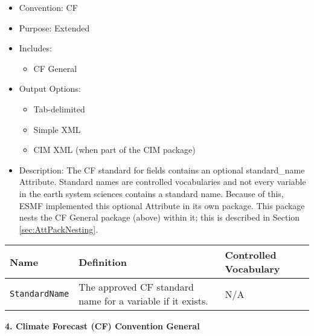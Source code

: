 \begin{itemize}
    \item Convention: CF
    \item Purpose: Extended
    \item Includes: 
    \begin{itemize}
        \item CF General
    \end{itemize}
    \item Output Options: 
    \begin{itemize}
        \item Tab-delimited
        \item Simple XML
        \item CIM XML (when part of the CIM package)
    \end{itemize} 
    \item Description: The CF standard for fields contains an optional standard\_name Attribute. Standard names are controlled vocabularies and not every variable in the earth system sciences contains a standard name. Because of this, ESMF implemented this optional Attribute in its own package. This package nests the CF General package (above) within it; this is described in Section \ref{sec:AttPackNesting}.
\end{itemize}

\begin{tabular}{|p{5cm}|p{7cm}|p{5cm}|}
    {\bf Name } & {\bf Definition} & {\bf Controlled Vocabulary} \\
    \hline\hline
    {\tt StandardName} & The approved CF standard name for a variable if it exists. &  N/A\\
\end{tabular}

\vspace{.20in}

{\bf 4. Climate Forecast (CF) Convention General}

